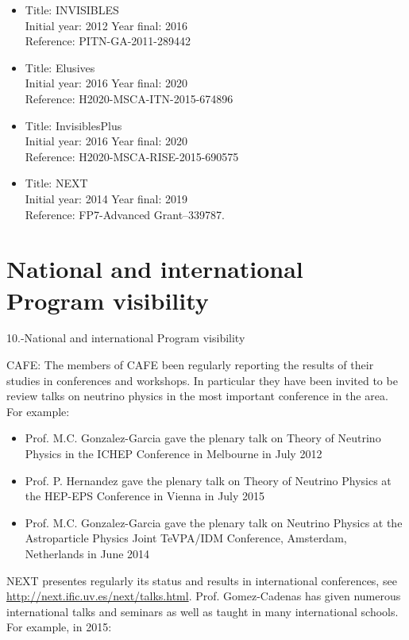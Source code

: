 \documentclass[a4paper,11pt,oneside]{article}
\begin{document}
\begin{itemize}
\item 
Title: INVISIBLES\\
Initial year: 2012 Year final: 2016\\
Reference: PITN-GA-2011-289442\\
\item 
Title: 	Elusives\\
Initial year: 2016 Year final: 2020\\
Reference: H2020-MSCA-ITN-2015-674896 \\
\item  Title: 	InvisiblesPlus\\
Initial year: 2016 Year final: 2020\\
Reference: H2020-MSCA-RISE-2015-690575\\
\item Title: NEXT \\
Initial year: 2014 Year final: 2019\\
Reference: FP7-Advanced Grant--339787.
\end{itemize}

\section{\bf \textsf{National and international Program visibility}}

10.-National and international Program visibility

CAFE: The members of CAFE been regularly reporting the results of their 
studies in  conferences and workshops. In particular they have been invited to
be review talks on neutrino physics in the most important conference
in the area. For example:
\begin{itemize}
\item Prof. M.C. Gonzalez-Garcia gave the plenary talk on Theory of Neutrino
Physics in the ICHEP Conference in Melbourne in July 2012
\item Prof. P. Hernandez gave the plenary talk on Theory of Neutrino Physics
at the HEP-EPS Conference in Vienna in July 2015 
\item Prof. M.C. Gonzalez-Garcia gave the plenary talk on Neutrino Physics
at the  Astroparticle Physics Joint  TeVPA/IDM Conference, Amsterdam, 
Netherlands in June 2014
\end{itemize}

NEXT presentes regularly its status and results in international conferences, see
\url{http://next.ific.uv.es/next/talks.html}. Prof. Gomez-Cadenas has given numerous international talks and seminars as well as
taught in many international schools. For example, in 2015:
\end{document}
